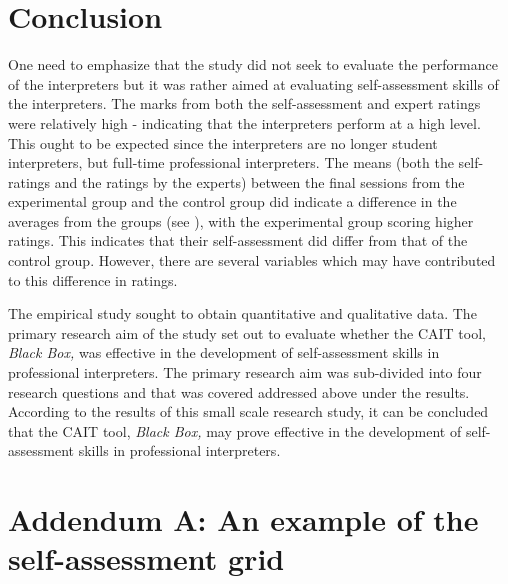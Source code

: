 \documentclass[output=paper]{langsci/langscibook}
\begin{document}
\section{Conclusion}

One need to emphasize that the study did not seek to evaluate the performance of the interpreters but it was rather aimed at evaluating self-assessment skills of the interpreters. The marks from both the self-assessment and expert ratings were relatively high -  indicating that the interpreters perform at a high level. This ought to be expected since the interpreters are no longer student interpreters, but full-time professional interpreters. The means (both the self-ratings and the ratings by the experts) between the final sessions from the experimental group and the control group did indicate a difference in the averages from the groups (see ), with the experimental group scoring higher ratings. This indicates that their self-assessment did differ from that of the control group. However, there are several variables which may have contributed to this difference in ratings.  

The empirical study sought to obtain quantitative and qualitative data. The primary research aim of the study set out to evaluate whether the \textsc{CAIT} tool, \textit{Black Box,} was effective in the development of self-assessment skills in professional interpreters. The primary research aim was sub-divided into four research questions and that was covered addressed above under the results. According to the results of this small scale research study, it can be concluded that the \textsc{CAIT} tool, \textit{Black Box,} may prove effective in the development of self-assessment skills in professional interpreters. 


\section*{Addendum A: An example of the self-assessment grid}
\end{document}
